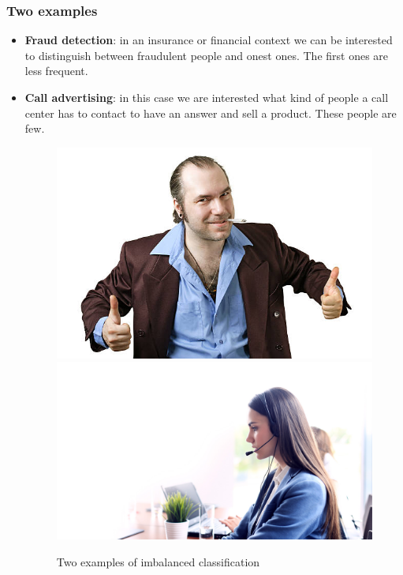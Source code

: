 \documentclass[9pt]{beamer}
\begin{document}
\begin{frame}
\frametitle{Two examples}
\begin{itemize}
\item \textbf{Fraud detection}: in an insurance or financial context we can be interested to distinguish between fraudulent people and onest ones. The first ones are less frequent.
\item \textbf{Call advertising}: in this case we are interested what kind of people a call center has to contact to have an answer and sell a product. These people are few.
\begin{figure}[ht]
\includegraphics[scale=0.70]{images/conman.jpg}
\includegraphics[scale=0.07]{images/callcenter.jpg}
\caption{Two examples of imbalanced classification}
\end{figure}
\end{itemize}
\end{frame}
\end{document}

